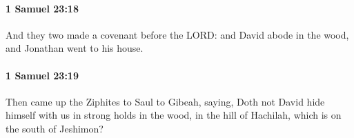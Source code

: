 		\paragraph{1 Samuel 23:18} %
			\label{1SAMUEL-23-18}

			And they two made a covenant before the LORD: and David abode in the wood, and Jonathan went to his house.


		\paragraph{1 Samuel 23:19} %
			\label{1SAMUEL-23-19}

			Then came up the Ziphites to Saul to Gibeah, saying, Doth not David hide himself with us in strong holds in the wood, in the hill of Hachilah, which is on the south of Jeshimon?


